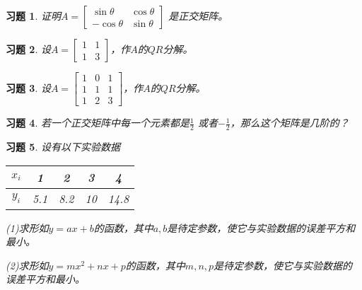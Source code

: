 \documentclass[a4paper]{book}
\newtheorem{ex}{习题}[chapter]
\begin{document}
\begin{ex}\label{6.27}
证明$A=\begin{bmatrix}\sin\theta&\cos\theta\\-\cos\theta&\sin\theta\end{bmatrix}$ 是正交矩阵。
\end{ex}

\begin{ex}\label{6.28}
设$A=\begin{bmatrix}1&1\\1&3\end{bmatrix}$，作$A$的$QR$分解。
\end{ex}

\begin{ex}\label{6.29}
设$A=\begin{bmatrix}1&0&1\\1&1&1\\1&2&3\end{bmatrix}$，作$A$的$QR$分解。
\end{ex}

\begin{ex}\label{6.30}
若一个正交矩阵中每一个元素都是$\frac{1}{2}$ 或者$-\frac{1}{2}$，那么这个矩阵是几阶的？
\end{ex}

\begin{ex}\label{6.31}
设有以下实验数据
\begin{table}[H]
\centering
\begin{tabular}{ccccc}
  \hline
   $x_i$ & 1 & 2 & 3& 4 \\
   \hline
   $y_i$ & 5.1 & 8.2 & 10& 14.8 \\
  \hline
\end{tabular}
\end{table}

(1)求形如$y=ax+b$的函数，其中$a,b$是待定参数，使它与实验数据的误差平方和最小。

(2)求形如$y=mx^2+nx+p$的函数，其中$m,n,p$是待定参数，使它与实验数据的误差平方和最小。
\end{ex}

\end{document}
